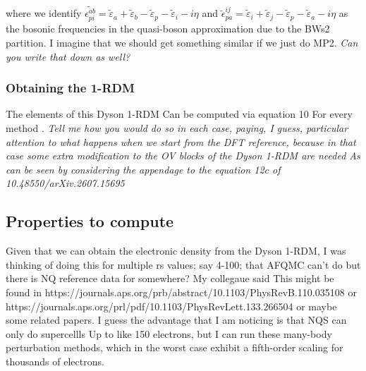 where we identify $\tilde{\epsilon_{pi}^{ab}} = \tilde{\varepsilon}_a + \tilde{\varepsilon}_b - \tilde{\varepsilon}_p - \tilde{\varepsilon}_i-i\eta$ and $\tilde{\epsilon}_{pa}^{ij} = \tilde{\varepsilon}_i + \tilde{\varepsilon}_j - \tilde{\varepsilon}_p - \tilde{\varepsilon}_a - i\eta$
as the bosonic frequencies in the quasi-boson approximation due to the BWs2 partition. I imagine that we should get something similar if we just do MP2. \emph{Can you write that down as well? }
\subsubsection{Obtaining the 1-RDM}
The elements of this Dyson 1-RDM Can be computed via equation 10 For every method . \emph{Tell me how you would do so in each case, paying, I guess, particular attention to what happens when we start from the DFT reference, because in that case some extra modification to the  OV blocks of the Dyson 1-RDM are needed As can be seen by considering the appendage to the equation 12c of 10.48550/arXiv.2607.15695}
\subsection{Properties to compute }
Given that we can obtain the electronic density from the Dyson 1-RDM, I was thinking of doing this for multiple rs values; say 4-100; that AFQMC can't do but there is NQ reference data for somewhere? My collegaue said This might be found in https://journals.aps.org/prb/abstract/10.1103/PhysRevB.110.035108 or https://journals.aps.org/prl/pdf/10.1103/PhysRevLett.133.266504 or maybe some related papers. I guess the advantage that I am noticing is that NQS can only do supercellls Up to like 150 electrons, but I can run these many-body perturbation methods, which in the worst case exhibit a fifth-order scaling for thousands of electrons. 

